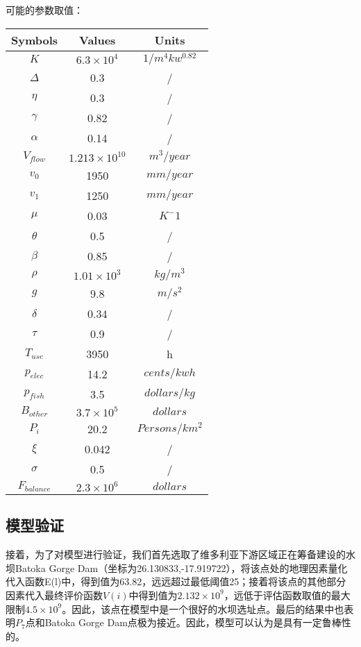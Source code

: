 \documentclass[nocover]{cumcmart}
\begin{document}
可能的参数取值：
\begin{table}[!ht]
\centering
  \begin{tabular}{ccc}
  \hline
  Symbols & Values & Units \\
  \hline
  $K$ & $6.3\times10^4$ & $1/m^{4}kw^{0.82}$ \\
  $\Delta$ & 0.3 & / \\
  $\eta$ & 0.3 & / \\
  $\gamma$ & 0.82 & / \\
  $\alpha$ & 0.14 & / \\
  $V_{flow}$ & $1.213\times10^{10}$ & $m^3/year$ \\
  $v_0$ & 1950 & $mm/year$\\
  $v_1$ & 1250  & $mm/year$\\
  $\mu$ & 0.03 & $K^-1$\\
  $\theta$ & 0.5 & / \\
  $\beta$ & 0.85 & / \\
  $\rho$ & $1.01\times10^3$ & $kg/m^3$\\
  $g$ & 9.8 & $m/s^2$\\
  $\delta$ & 0.34 & / \\
  $\tau$ & 0.9 & / \\
  $T_{use}$ & 3950 & h \\
  $p_{elec}$ & 14.2 & $cents/kwh$ \\
  $p_{fish}$ & 3.5 & $dollars/kg$ \\
  $B_{other}$ & $3.7\times10^5$ & $dollars$ \\
  $P_{i}$ & 20.2 & $Persons/km^2$\\
  $\xi$ & 0.042 & / \\
  $\sigma$ & 0.5 & / \\
  $F_{balance}$ & $2.3\times10^6$ & $dollars$ \\
  \hline
  \end{tabular}
\end{table}

\subsection{模型验证}
接着，为了对模型进行验证，我们首先选取了维多利亚下游区域正在筹备建设的水坝Batoka Gorge Dam（坐标为26.130833,-17.919722），将该点处的地理因素量化代入函数E(l)中，得到值为63.82，远远超过最低阈值25；接着将该点的其他部分因素代入最终评价函数$V(i)$中得到值为$2.132\times10^9$，远低于评估函数取值的最大限制$4.5\times10^{9}$。因此，该点在模型中是一个很好的水坝选址点。最后的结果中也表明$P_7$点和Batoka Gorge Dam点极为接近。因此，模型可以认为是具有一定鲁棒性的。
\end{document}
